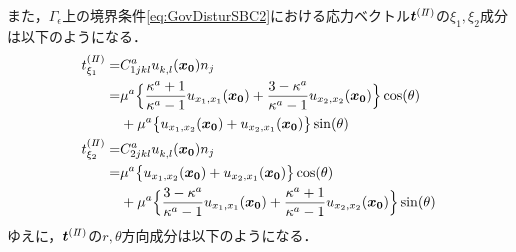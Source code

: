 \documentclass[titlepage,a4paper,12pt,oneside,dvipdfmx]{jsbook}
\begin{document}
また，$\Gamma_\epsilon$上の境界条件\eqref{eq:GovDisturSBC2}における応力ベクトル$\bm{t}^{(I\hspace{-.15em}I)}$の$\xi_1,\xi_2$成分は以下のようになる．
\begin{align}
	t_{\xi_1}^{(I\hspace{-.15em}I)}=&C_{1jkl}^{a}u_{k,l}^{}(\bm{x_{0}})n_{j}
		\nonumber
		\\
		=&\mu^a\Bigl\{\frac{\kappa^a+1}{\kappa^a-1} u_{x_{1},x_{1}}(\bm{x_{0}})
		+\frac{3-\kappa^a}{\kappa^a-1} u_{x_{2},x_{2}}(\bm{x_{0}})\Bigr\}\cos(\theta)
		\nonumber
		\\
		&+\mu^a\bigl\{u_{x_{1},x_{2}}(\bm{x_{0}})+u_{x_{2},x_{1}}(\bm{x_{0}})\bigr\}\sin(\theta)
	\\
	t_{\xi_2}^{(I\hspace{-.15em}I)}=&C_{2jkl}^{a}u_{k,l}^{}(\bm{x_{0}})n_{j}
		\nonumber
		\\
		=&\mu^a \bigl\{u_{x_{1},x_{2}}(\bm{x_{0}})+u_{x_{2},x_{1}}(\bm{x_{0}})\bigr\}\cos(\theta)
		\nonumber
		\\
		&+\mu^a\Bigl\{ \frac{3-\kappa^a}{\kappa^a-1} u_{x_{1},x_{1}}(\bm{x_{0}})
		+\frac{\kappa^a+1}{\kappa^a-1} u_{x_{2},x_{2}}(\bm{x_{0}})\Bigr\}\sin(\theta)
\end{align}
ゆえに，$\bm{t}^{(I\hspace{-.15em}I)}$の$r,\theta$方向成分は以下のようになる．
\end{document}
